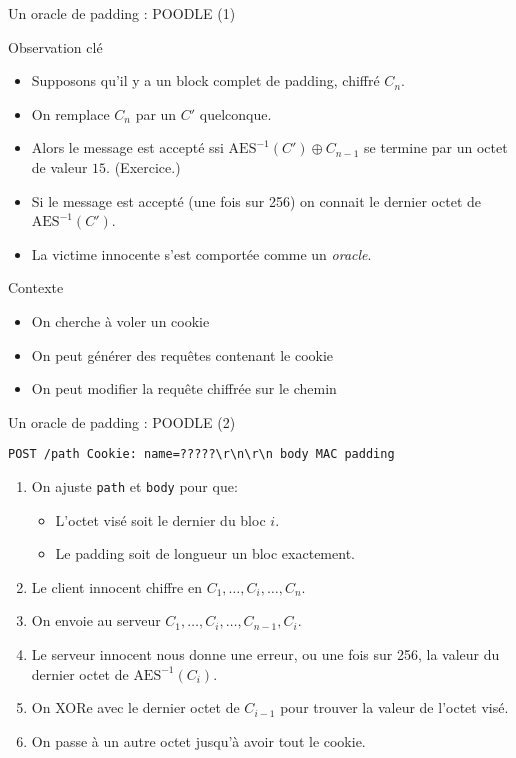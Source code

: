 \documentclass{mpg-ep-slides}
\begin{document}
\begin{frame}{Un oracle de padding : POODLE (1)}
  \begin{block}{Observation clé}
    \begin{itemize}
      \item Supposons qu'il y a un block complet de padding, chiffré $C_n$.
      \item On remplace $C_n$ par un $C'$ quelconque.
      \item Alors le message est accepté ssi $\text{AES}^{-1}(C') \oplus
        C_{n-1}$ se termine par un octet de valeur $15$. (Exercice.)
      \item Si le message est accepté (une fois sur 256) on connait le dernier
        octet de $\text{AES}^{-1}(C')$.
      \item La victime innocente s'est comportée comme un \emph{oracle}.
    \end{itemize}
  \end{block}

  \begin{block}{Contexte}
    \begin{itemize}
      \item On cherche à voler un cookie
      \item On peut générer des requêtes contenant le cookie
      \item On peut modifier la requête chiffrée sur le chemin
    \end{itemize}
  \end{block}
\end{frame}

\begin{frame}[containsverbatim]{Un oracle de padding : POODLE (2)}
  \begin{Verbatim}[gobble=4]
    POST /path Cookie: name=?????\r\n\r\n body MAC padding
  \end{Verbatim}
  \begin{enumerate}
    \item On ajuste \texttt{path} et \texttt{body} pour que:
      \begin{itemize}
        \item L'octet visé soit le dernier du bloc $i$.
        \item Le padding soit de longueur un bloc exactement.
      \end{itemize}
    \item Le client innocent chiffre en $C_1, \dots, C_i, \dots, C_n$.
    \item On envoie au serveur $C_1, \dots, C_i, \dots, C_{n-1}, C_i$.
    \item Le serveur innocent nous donne une erreur, ou une fois sur 256, la
      valeur du dernier octet de $\text{AES}^{-1}(C_i)$.
    \item On XORe avec le dernier octet de $C_{i-1}$ pour trouver la valeur de
      l'octet visé.
    \item On passe à un autre octet jusqu'à avoir tout le cookie.
  \end{enumerate}
\end{frame}
\end{document}
